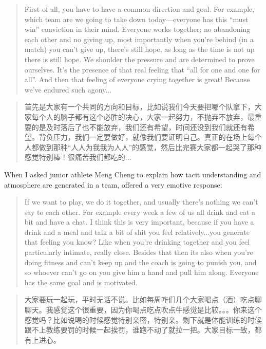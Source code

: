 \begin{CJK}{UTF8}{gbsn}
    \begin{quote}
      First of all, you have to have a common direction and goal.  For example, which team are we going to take down today---everyone has this ``must win'' conviction in their mind.  Everyone works together; no abandoning each other and no giving up, most importantly when you’re behind (in a match) you can’t give up, there’s still hope, as long as the time is not up there is still hope.  We shoulder the pressure and are determined to prove ourselves.  It's the presence of that real feeling that ``all for one and one for all''.  And then that feeling of everyone crying together is great! Because we've endured such agony...
    \end{quote}

    \begin{quote}
      首先是大家有一个共同的方向和目标，比如说我们今天要把哪个队拿下，大家每个人的脑子都有这个必胜的决心，大家一起努力，不抛弃不放弃，最重要的是及时落后了也不能放弃，我们还有希望，时间还没到我们就还有希望。背负压力，我们一定要做好，就像我们要证明自己。真正的在场上每个人都做到那种“人人为我我为人人”的感觉，然后比完赛大家都一起哭了那种感觉特别棒！很痛苦我们都吃的...
    \end{quote}

When I asked junior athlete Meng Cheng to explain how tacit understanding and atmosphere are generated in a team, offered a very emotive response:

      \begin{quote}
        If we want to play, we do it together, and usually there’s nothing we can’t say to each other.  For example every week a few of us all drink and eat a bit and have a chat.  I think this is very important, because if you have a drink and a meal and talk a bit of shit you feel relatively...you generate that feeling you know? Like when you’re drinking together and you feel particularly intimate, really close.  Besides that then its also when you’re doing fitness and can’t keep up and the coach is going to punish you, and so whoever can’t go on you give him a hand and pull him along.  Everyone has the same goal and is motivated.
      \end{quote}

      \begin{quote}
        大家要玩一起玩，平时无话不说。比如每周咋们几个大家喝点（酒）吃点聊聊天。我感觉这个很重要，因为你喝点吃点吹点牛感觉是比较。。。你来这个感觉吗？比如说喝的时候感觉特别亲密，特别亲。剩下就是体能训练的时候跟不上教练要罚的时候一起挨罚，谁跑不动了就拉一把。大家目标一致，都有上进心。 
      \end{quote}


\end{CJK}
